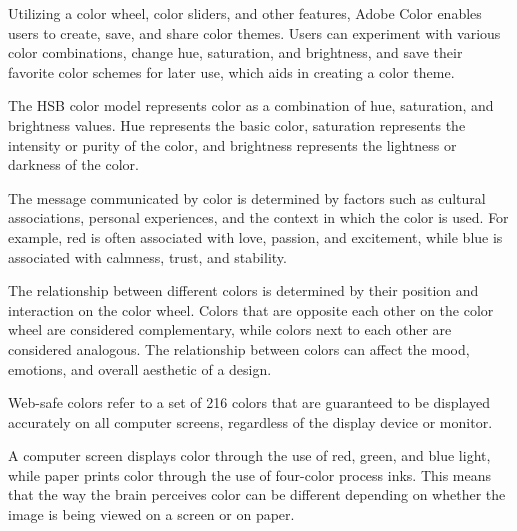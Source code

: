 \documentclass{report}
\begin{document}
    \bigbreak \noindent \bigbreak \noindent 
    \bigbreak \noindent 
    Utilizing a color wheel, color sliders, and other features, Adobe Color enables users to create, save, and share color themes. Users can experiment with various color combinations, change hue, saturation, and brightness, and save their favorite color schemes for later use, which aids in creating a color theme.

    \bigbreak \noindent \bigbreak \noindent 
    \bigbreak \noindent 
    The HSB color model represents color as a combination of hue, saturation, and brightness values. Hue represents the basic color, saturation represents the intensity or purity of the color, and brightness represents the lightness or darkness of the color.

    \bigbreak \noindent \bigbreak \noindent 
    \bigbreak \noindent 
    The message communicated by color is determined by factors such as cultural associations, personal experiences, and the context in which the color is used. For example, red is often associated with love, passion, and excitement, while blue is associated with calmness, trust, and stability.

    \bigbreak \noindent \bigbreak \noindent 
    \bigbreak \noindent 
    The relationship between different colors is determined by their position and interaction on the color wheel. Colors that are opposite each other on the color wheel are considered complementary, while colors next to each other are considered analogous. The relationship between colors can affect the mood, emotions, and overall aesthetic of a design.

    \bigbreak \noindent \bigbreak \noindent 
    \bigbreak \noindent 
    Web-safe colors refer to a set of 216 colors that are guaranteed to be displayed accurately on all computer screens, regardless of the display device or monitor.

    \bigbreak \noindent \bigbreak \noindent 
    \bigbreak \noindent 
    A computer screen displays color through the use of red, green, and blue light, while paper prints color through the use of four-color process inks. This means that the way the brain perceives color can be different depending on whether the image is being viewed on a screen or on paper.
\end{document}
